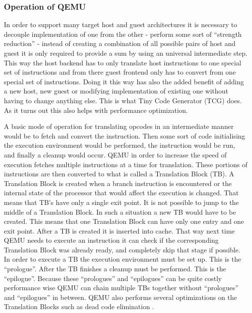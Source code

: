 \subsubsection{Operation of QEMU}

In order to support many target host and guest architectures it is necessary to
decouple implementation of one from the other - perform some sort of ``strength
reduction'' - instead of creating a combination of all possible pairs of host
and guest it is only required to provide a sum by using an universal
intermediate step. This way the host backend has to only translate host
instructions to one special set of instructions and from there guest frontend
only has to convert from one special set of instructions. Doing it this way has
also the added benefit of adding a new host, new guest or modifying
implementation of existing one without having to change anything else. This is
what Tiny Code Generator (TCG) does. As it turns out this also helps with
performance optimization.

A basic mode of operation for translating opcodes in an intermediate manner
would be to fetch and convert the instruction. Then some sort of code
initialising the execution environment would be performed, the instruction would
be run, and finally a cleanup would occur. QEMU in order to increase the speed
of execution fetches multiple instructions at a time for translation.  These
portions of instructions are then converted to what is called a Translation
Block (TB). A Translation Block is created when a branch instruction is
encountered or the internal state of the processor that would affect the
execution is changed. That means that TB's have only a single exit point. It is
not possible to jump to the middle of a Translation Block. In such a situation
a new TB would have to be created. This means that one Translation Block can
have only one entry and one exit point. After a TB is created it is inserted
into cache. That way next time QEMU needs to execute an instruction it can check
if the corresponding Translation Block was already ready, and completely skip
that stage if possible. In order to execute a TB the execution environment must
be set up. This is the ``prologue''. After the TB finishes a cleanup must be
performed. This is the ``epilogue''. Because these ``prologues'' and
``epilogues'' can be quite costly performance wise QEMU can chain multiple TBs
together without ``prologues'' and ``epilogues'' in between. QEMU also performs
several optimizations on the Translation Blocks such as dead code elimination
\cite{qemu2022} \cite{vasut2017}.

